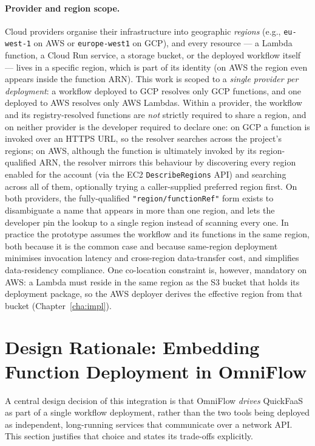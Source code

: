 \paragraph{Provider and region scope.}
Cloud providers organise their infrastructure into geographic \emph{regions} (e.g., \texttt{eu-west-1}
on AWS or \texttt{europe-west1} on GCP), and every resource --- a Lambda function, a Cloud Run
service, a storage bucket, or the deployed workflow itself --- lives in a specific region, which is
part of its identity (on AWS the region even appears inside the function ARN). This work is scoped
to a \emph{single provider per deployment}: a workflow deployed to GCP resolves only GCP functions,
and one deployed to AWS resolves only AWS Lambdas. Within a provider, the workflow and its registry-resolved
functions are \emph{not} strictly required to share a region, and on neither provider is the
developer required to declare one: on GCP a function is invoked over an HTTPS URL, so the resolver
searches across the project's regions; on AWS, although the function is ultimately invoked by its
region-qualified ARN, the resolver mirrors this behaviour by discovering every region enabled for
the account (via the EC2 \texttt{DescribeRegions} API) and searching across all of them, optionally
trying a caller-supplied preferred region first. On both providers, the fully-qualified
\texttt{"region/functionRef"} form exists to disambiguate a name that appears in more than one
region, and lets the developer pin the lookup to a single region instead of scanning every one. In
practice the
prototype assumes the workflow and its functions in the same region, both because it is the common
case and because same-region deployment minimises invocation latency and cross-region data-transfer
cost, and simplifies data-residency compliance. One co-location constraint is, however, mandatory
on AWS: a Lambda must reside in the same region as the S3 bucket that holds its deployment package,
so the AWS deployer derives the effective region from that bucket
(Chapter~\ref{cha:impl}).

\section{Design Rationale: Embedding Function Deployment in OmniFlow}
\label{sec:design-rationale}

A central design decision of this integration is that OmniFlow \emph{drives} QuickFaaS as part of a
single workflow deployment, rather than the two tools being deployed as independent, long-running
services that communicate over a network API. This section justifies that choice and states its
trade-offs explicitly.

